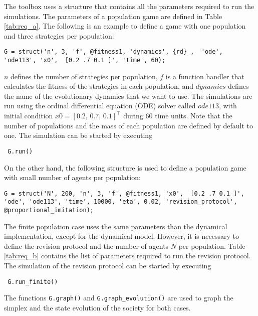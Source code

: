 The toolbox uses a structure that contains all the parameters required to run the simulations. The parameters of a population game are defined in Table \ref{tab:req_a}. The following is an example to define a game with one population and three strategies per population:
%
\begin{lstlisting}
G = struct('n', 3, 'f', @fitness1, 'dynamics', {rd} ,  'ode', 'ode113', 'x0',  [0.2 .7 0.1 ]', 'time', 60);
\end{lstlisting}
%
$n$ defines the number of strategies per population, $f$ is a function handler that calculates the fitness of the strategies in each population, and $dynamics$ defines the name of the evolutionary dynamics that we want to use. The simulations are run using the ordinal differential equation (ODE) solver called $ode113$, with initial condition $x0 = [0.2, \, 0.7, \, 0.1 ]^\top$ during $60$ time units.
Note that the number of populations and the mass of each population are defined by default to one.  The simulation can be started by executing
%
\begin{lstlisting}
 G.run()
\end{lstlisting}




On the other hand, the following structure is used to define a population game with small number of agents per population:
%
\begin{lstlisting}
G = struct('N', 200, 'n', 3, 'f', @fitness1, 'x0',  [0.2 .7 0.1 ]', 'ode', 'ode113', 'time', 10000, 'eta', 0.02, 'revision_protocol', @proportional_imitation); 
\end{lstlisting}
%
The finite population case uses the same parameters than the dynamical implementation, except for the dynamical model. However, it is necessary to define the revision protocol  and the number of agents $N$ per population.
Table \ref{tab:req_b} contains the list of parameters required to run the revision protocol. The simulation of the revision protocol can be started by executing
\begin{lstlisting}
 G.run_finite()
\end{lstlisting}

The functions \verb|G.graph()| and \verb|G.graph_evolution()| are used to graph the simplex and the state evolution of the society for both cases.





